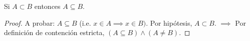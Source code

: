 \begin{problema}
	Si $A\subset B$ entonces $A\subseteq B$. 
\end{problema}

\begin{proof}
	A probar: $A\subseteq B$ (i.e. $x\in A\implies x\in B)$. Por hipótesis, $A\subset B$. $\implies$ Por definición de contención estricta, $(A\subseteq B)\wedge (A\neq B)$. 
\end{proof}






